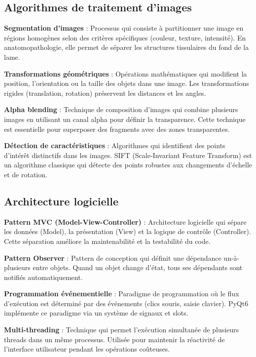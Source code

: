 \documentclass[12pt,a4paper]{report}
\begin{document}
\subsection{Algorithmes de traitement d'images}

\textbf{Segmentation d'images} : Processus qui consiste à partitionner une image en régions homogènes selon des critères spécifiques (couleur, texture, intensité). En anatomopathologie, elle permet de séparer les structures tissulaires du fond de la lame.

\textbf{Transformations géométriques} : Opérations mathématiques qui modifient la position, l'orientation ou la taille des objets dans une image. Les transformations rigides (translation, rotation) préservent les distances et les angles.

\textbf{Alpha blending} : Technique de composition d'images qui combine plusieurs images en utilisant un canal alpha pour définir la transparence. Cette technique est essentielle pour superposer des fragments avec des zones transparentes.

\textbf{Détection de caractéristiques} : Algorithmes qui identifient des points d'intérêt distinctifs dans les images. SIFT (Scale-Invariant Feature Transform) est un algorithme classique qui détecte des points robustes aux changements d'échelle et de rotation.

\subsection{Architecture logicielle}

\textbf{Pattern MVC (Model-View-Controller)} : Architecture logicielle qui sépare les données (Model), la présentation (View) et la logique de contrôle (Controller). Cette séparation améliore la maintenabilité et la testabilité du code.

\textbf{Pattern Observer} : Pattern de conception qui définit une dépendance un-à-plusieurs entre objets. Quand un objet change d'état, tous ses dépendants sont notifiés automatiquement.

\textbf{Programmation événementielle} : Paradigme de programmation où le flux d'exécution est déterminé par des événements (clics souris, saisie clavier). PyQt6 implémente ce paradigme via un système de signaux et slots.

\textbf{Multi-threading} : Technique qui permet l'exécution simultanée de plusieurs threads dans un même processus. Utilisée pour maintenir la réactivité de l'interface utilisateur pendant les opérations coûteuses.
\end{document}
